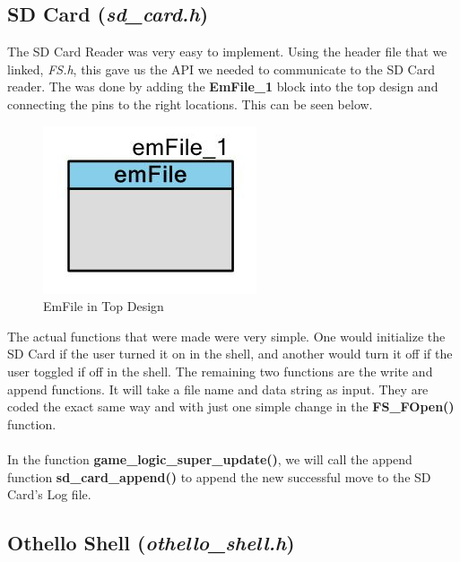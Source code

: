 \documentclass[a4paper, 12pt]{article}
\begin{document}
    


    
    \subsection{SD Card (\textit{sd\_card.h})}

    The SD Card Reader was very easy to implement. Using the header file that
    we linked, \textit{FS.h}, this gave us the API we needed to communicate to
    the SD Card reader. The was done by adding the \textbf{EmFile\_1} block
    into the top design and connecting the pins to the right locations. This
    can be seen below.
    
    \begin{figure}[H]
        \centering
        \includegraphics[scale=0.6]{pics/sd_card}
        \caption{EmFile in Top Design}
        \label{fig:TopDesign}
    \end{figure}
    
     The actual functions that were made were very simple. One would initialize
    the SD Card if the user turned it on in the shell, and another would
    turn it off if the user toggled if off in the shell.
    The remaining two functions are the write and append functions. It will
    take a file name and data string as input. They are coded the exact same
    way and with just one simple change in the \textbf{FS\_FOpen()} function.
    \\ \\
    In the function \textbf{game\_logic\_super\_update()}, we will call the
    append function \textbf{sd\_card\_append()} to append the new successful move
    to the SD Card's Log file. 





    
    \subsection{Othello Shell (\textit{othello\_shell.h})}
\end{document}
